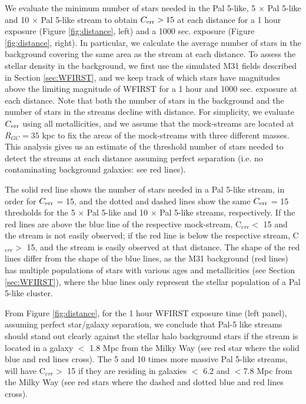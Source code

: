 \documentclass[twocolumn]{aastex62}
\begin{document}
We evaluate the minimum number of stars needed in the Pal 5-like, 5 $\times$ Pal 5-like and 10 $\times$ Pal 5-like stream to obtain $C_{\rm err} > 15$ at each distance for a 1 hour exposure (Figure \ref{fig:distance}, left) and a 1000 sec. exposure (Figure \ref{fig:distance}, right). In particular, we calculate the average number of stars in the background covering the same area as the stream at each distance. To assess the stellar density in the background, we first use the simulated M31 fields described in Section \ref{sec:WFIRST}, and we keep track of which stars have magnitudes above the limiting magnitude of WFIRST for a 1 hour and 1000 sec. exposure at each distance. Note that both the number of stars in the background and the number of stars in the streams decline with distance. For simplicity, we evaluate $C_{\rm err}$ using all metallicities, and we assume that the mock-streams are located at $R_{GC} = 35$ kpc to fix the areas of the mock-streams with three different masses. This analysis gives us an estimate of the threshold number of stars needed to detect the streams at each distance assuming perfect separation (i.e. no contaminating background galaxies: see red lines). 
 
The solid red line shows the number of stars needed in a Pal 5-like stream, in order for $C_{\rm err}$ = 15, and the dotted and dashed lines show the same $C_{\rm err}$ = 15 thresholds for the 5 $\times$ Pal 5-like and 10 $\times$ Pal 5-like streams, respectively. If the red lines are above the blue line of the respective mock-stream, C$_{err} <$ 15 and the stream is not easily observed; if the red line is below the respective stream, C$_{err} >$ 15, and the stream is easily observed at that distance.  The shape of the red lines differ from the shape of the blue lines, as the M31 background (red lines) has multiple populations of stars with various ages and metallicities (see Section \ref{sec:WFIRST}), where the blue lines only represent the stellar population of a Pal 5-like cluster.

From Figure \ref{fig:distance}, for the 1 hour WFIRST exposure time (left panel), assuming perfect star/galaxy separation, we conclude that Pal-5 like streams should stand out clearly against the stellar halo background stars if the stream is located in a galaxy $<$ 1.8 Mpc from the Milky Way (see red star where the solid blue and red lines cross). The 5 and 10 times  more massive Pal 5-like streams, will have C$_{err} >$ 15 if they are residing in galaxies $<$ 6.2 and $<$7.8 Mpc from the Milky Way (see red stars where the dashed and dotted blue and red lines cross). 
\end{document}
